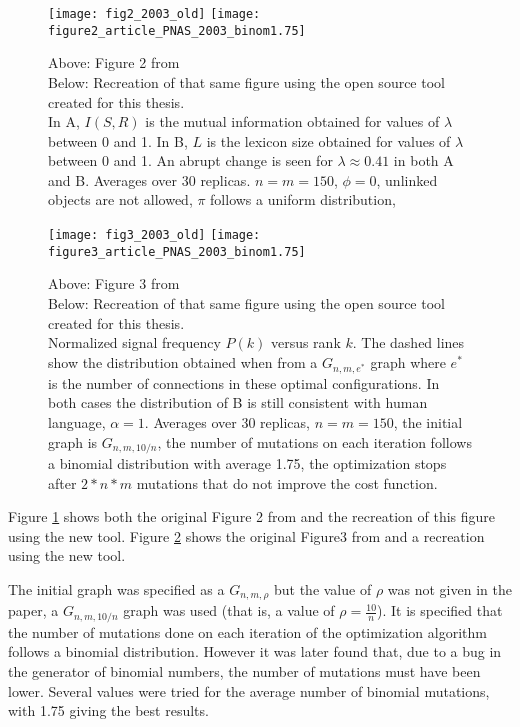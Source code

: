 \begin{figure}
  \centering
  \texttt{[image: fig2\_2003\_old]}
  \texttt{[image: figure2\_article\_PNAS\_2003\_binom1.75]}
  \caption{
    Above: Figure 2 from \cite{Ferrer2003a}\\
    Below: Recreation of that same figure using the open source tool created for this thesis.\\
    In A, $I(S,R)$ is the mutual information obtained for values of $\lambda$ between 0 and 1.
    In B, $L$ is the lexicon size obtained for values of $\lambda$ between 0 and 1.
    An abrupt change is seen for $\lambda \approx 0.41$ in both A and B.
    Averages over 30 replicas.
    $n=m=150$, $\phi=0$, unlinked objects are not allowed, $\pi$ follows a uniform distribution, 
  }
  \label{fig:fig2_2003}
\end{figure}

\begin{figure}
  \centering
  \texttt{[image: fig3\_2003\_old]}
  \texttt{[image: figure3\_article\_PNAS\_2003\_binom1.75]}
  \caption{
    Above: Figure 3 from \cite{Ferrer2003a}\\
    Below: Recreation of that same figure using the open source tool created for this thesis.
    \\
    Normalized signal frequency $P(k)$ versus rank $k$.
    The dashed lines show the distribution obtained when from a $G_{n,m,e^*}$ graph where $e^*$ is the number of connections in these optimal configurations.
    In both cases the distribution of B is still consistent with human language, $\alpha=1$.
    Averages over 30 replicas, $n=m=150$, the initial graph is $G_{n,m,10/n}$, the number of mutations on each iteration follows a binomial distribution with average 1.75, the optimization stops after $2*n*m$ mutations that do not improve the cost function.
  }
  \label{fig:fig3_2003}
\end{figure}

Figure \ref{fig:fig2_2003} shows both the original Figure 2 from \cite{Ferrer2003a} and the recreation of this figure using the new tool.
Figure \ref{fig:fig3_2003} shows the original Figure3 from \cite{Ferrer2003a} and a recreation using the new tool.

The initial graph was specified as a $G_{n,m,\rho}$ but the value of $\rho$ was not given in the paper, a $G_{n,m,10/n}$ graph was used (that is, a value of $\rho=\frac{10}{n}$).
It is specified that the number of mutations done on each iteration of the optimization algorithm follows a binomial distribution.
However it was later found that, due to a bug in the generator of binomial numbers, the number of mutations must have been lower.
Several values were tried for the average number of binomial mutations, with 1.75 giving the best results.

